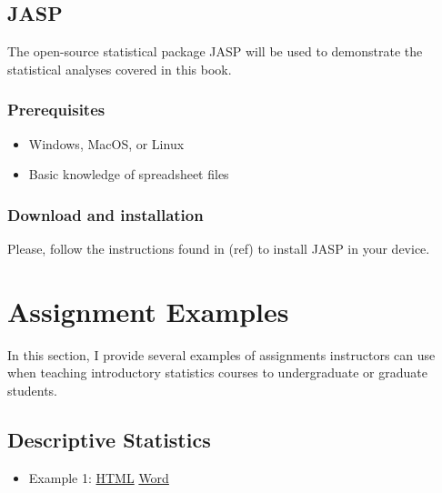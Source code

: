\documentclass[
]{book}
\providecommand{\tightlist}{%
  \setlength{\itemsep}{0pt}\setlength{\parskip}{0pt}}
\begin{document}
\hypertarget{jasp}{%
\section{JASP}\label{jasp}}

The open-source statistical package JASP \citep{JASP2020} will be used to demonstrate the statistical analyses covered in this book.

\hypertarget{prerequisites}{%
\subsection{Prerequisites}\label{prerequisites}}

\begin{itemize}
\tightlist
\item
  Windows, MacOS, or Linux
\item
  Basic knowledge of spreadsheet files
\end{itemize}

\hypertarget{download-and-installation}{%
\subsection{Download and installation}\label{download-and-installation}}

Please, follow the instructions found in (ref) to install JASP in your device.

\hypertarget{assignment-examples}{%
\chapter{Assignment Examples}\label{assignment-examples}}

In this section, I provide several examples of assignments instructors can use when teaching introductory statistics courses to undergraduate or graduate students.

\hypertarget{descriptive-statistics}{%
\section{Descriptive Statistics}\label{descriptive-statistics}}

\begin{itemize}
\tightlist
\item
  Example 1: \href{assignments/homework-example-01.html}{HTML} \textbar{} \href{assignments/homework-example-01.docx}{Word}
\end{itemize}

  
\end{document}
